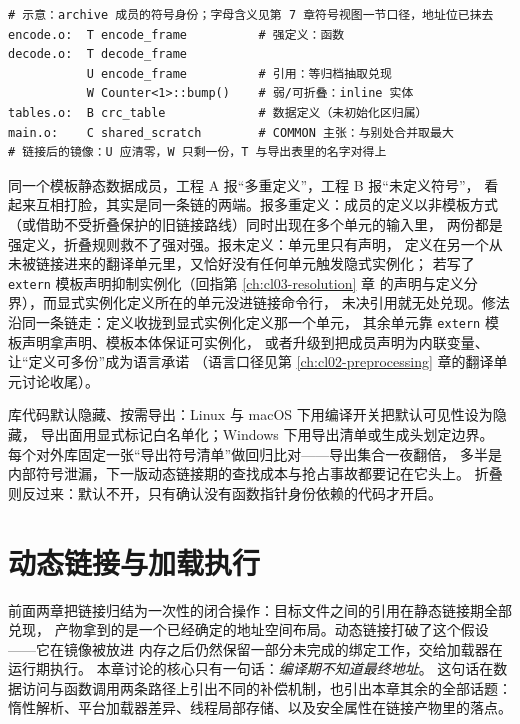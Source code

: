 \documentclass[12pt,a4paper,fontset=fandol]{ctexbook}
\newcommand{\Sw}[1]{\texttt{#1}}
\newcommand{\Nix}{\textsf{Linux}}
\newcommand{\Win}{\textsf{Windows}}
\newcommand{\Mac}{\textsf{macOS}}
\begin{document}
\begin{lstlisting}[style=outstyle, caption={示意：nm -A 视角下归档成员与引用方的符号账目（数值从略）}]
# 示意：archive 成员的符号身份；字母含义见第 7 章符号视图一节口径，地址位已抹去
encode.o:  T encode_frame          # 强定义：函数
decode.o:  T decode_frame
           U encode_frame          # 引用：等归档抽取兑现
           W Counter<1>::bump()    # 弱/可折叠：inline 实体
tables.o:  B crc_table             # 数据定义（未初始化区归属）
main.o:    C shared_scratch        # COMMON 主张：与别处合并取最大
# 链接后的镜像：U 应清零，W 只剩一份，T 与导出表里的名字对得上
\end{lstlisting}

\begin{abibox}[title={模板静态数据成员：两种相反的报错}]
同一个模板静态数据成员，工程 A 报“多重定义”，工程 B 报“未定义符号”，
看起来互相打脸，其实是同一条链的两端。报多重定义：成员的定义以非模板方式
（或借助不受折叠保护的旧链接路线）同时出现在多个单元的输入里，
两份都是强定义，折叠规则救不了强对强。报未定义：单元里只有声明，
定义在另一个从未被链接进来的翻译单元里，又恰好没有任何单元触发隐式实例化；
若写了 \Sw{extern} 模板声明抑制实例化（回指第 \ref{ch:cl03-resolution} 章
的声明与定义分界），而显式实例化定义所在的单元没进链接命令行，
未决引用就无处兑现。修法沿同一条链走：定义收拢到显式实例化定义那一个单元，
其余单元靠 \Sw{extern} 模板声明拿声明、模板本体保证可实例化，
或者升级到把成员声明为内联变量、让“定义可多份”成为语言承诺
（语言口径见第 \ref{ch:cl02-preprocessing} 章的翻译单元讨论收尾）。
\end{abibox}

\begin{bestpractice}[title={把“谁可见”写成构建层默认}]
库代码默认隐藏、按需导出：\Nix{} 与 \Mac{} 下用编译开关把默认可见性设为隐藏，
导出面用显式标记白名单化；\Win{} 下用导出清单或生成头划定边界。
每个对外库固定一张“导出符号清单”做回归比对——导出集合一夜翻倍，
多半是内部符号泄漏，下一版动态链接期的查找成本与抢占事故都要记在它头上。
折叠则反过来：默认不开，只有确认没有函数指针身份依赖的代码才开启。
\end{bestpractice}

\chapter{动态链接与加载执行}\label{ch:cl09-dynamic}

前面两章把链接归结为一次性的闭合操作：目标文件之间的引用在静态链接期全部兑现，
产物拿到的是一个已经确定的地址空间布局。动态链接打破了这个假设——它在镜像被放进
内存之后仍然保留一部分未完成的绑定工作，交给加载器在运行期执行。
本章讨论的核心只有一句话：\emph{编译期不知道最终地址}。
这句话在数据访问与函数调用两条路径上引出不同的补偿机制，也引出本章其余的全部话题：
惰性解析、平台加载器差异、线程局部存储、以及安全属性在链接产物里的落点。
\end{document}
